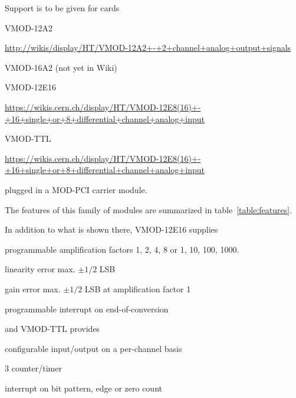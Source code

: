 \documentclass[11pt,a4paper]{article}
\begin{document}
Support is to be given for cards
\begin{compactitem}
    \item VMOD-12A2 
	\begin{flushleft}
	    \url{http://wikis/display/HT/VMOD-12A2+-+2+channel+analog+output+signals}
	\end{flushleft}
    \item VMOD-16A2 (not yet in Wiki)
    \item VMOD-12E16 
	\begin{flushleft}
	    \url{https://wikis.cern.ch/display/HT/VMOD-12E8(16)+-+16+single+or+8+differential+channel+analog+input}
	\end{flushleft}
    \item VMOD-TTL
	\begin{flushleft}
	    \url{https://wikis.cern.ch/display/HT/VMOD-12E8(16)+-+16+single+or+8+differential+channel+analog+input}
	\end{flushleft}
\end{compactitem}
plugged in a MOD-PCI carrier module.

The features of this family of modules are summarized in
table~\ref{table:features}. 

In addition to what is shown there, VMOD-12E16 supplies
\begin{compactitem}
    \item programmable amplification factors 1, 2, 4, 8 
	or 1, 10, 100, 1000.
    \item linearity error max. $\pm 1/2$ LSB
    \item gain error max. $\pm 1/2$ LSB at amplification factor 1
    \item programmable interrupt on end-of-conversion
\end{compactitem}
and VMOD-TTL provides
\begin{compactitem}
    \item configurable input/output on a per-channel basis
    \item 3 counter/timer
    \item interrupt on bit pattern, edge or zero count
\end{compactitem}
\end{document}

